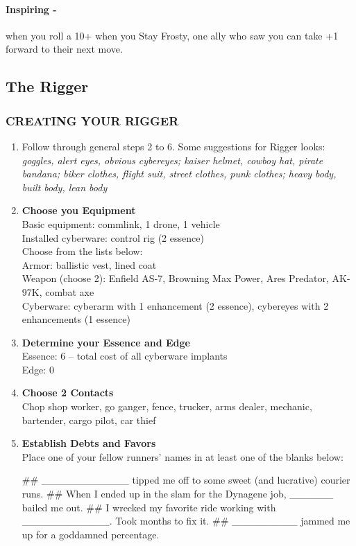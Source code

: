 \paragraph{Inspiring -} when you roll a 10+ when you Stay Frosty, one ally who saw you can take +1 forward to their next move.




\clearpage
\subsection{The Rigger}

\subsubsection{CREATING YOUR RIGGER}
\begin{enumerate}
    \item Follow through general steps 2 to 6. Some suggestions for Rigger looks: \textit{goggles, alert eyes, obvious cybereyes; kaiser helmet, cowboy hat, pirate bandana; biker clothes, flight suit, street clothes, punk clothes; heavy body, built body, lean body}
    
    \item \textbf{Choose you Equipment} \\
    Basic equipment: commlink, 1 drone, 1 vehicle \\
    Installed cyberware: control rig (2 essence) \\
    Choose from the lists below: \\
        Armor: ballistic vest, lined coat \\
        Weapon (choose 2): Enfield AS-7, Browning Max Power, Ares Predator, AK-97K, combat axe \\
        Cyberware: cyberarm with 1 enhancement (2 essence), cybereyes with 2 enhancements (1 essence)
    
    \item \textbf{Determine your Essence and Edge} \\
    Essence: 6 – total cost of all cyberware implants \\
    Edge: 0
    
    \item \textbf{Choose 2 Contacts} \\
    Chop shop worker, go ganger, fence, trucker, arms dealer, mechanic, bartender, cargo pilot, car thief
    
    \item \textbf{Establish Debts and Favors} \\
    Place one of your fellow runners’ names in at least one of the blanks below:
        \begin{easylist}
            ## \_\_\_\_\_\_\_\_\_\_\_\_ tipped me off to some sweet (and lucrative) courier runs.
            ## When I ended up in the slam for the Dynagene job, \_\_\_\_\_\_ bailed me out.
            ## I wrecked my favorite ride working with \_\_\_\_\_\_\_\_\_\_\_\_. Took months to fix it.
            ## \_\_\_\_\_\_\_\_\_ jammed me up for a goddamned percentage.
        \end{easylist}
    

\end{enumerate}
